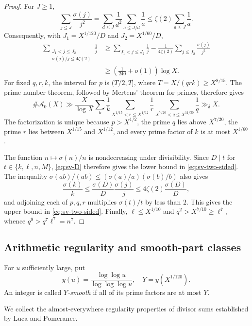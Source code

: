 \documentclass[11pt,letterpaper,reqno]{amsart}
\numberwithin{equation}{section}
\theoremstyle{remark}
\newcommand{\1}{\mathbf 1}
\renewcommand{\leq}{\leqslant}
\renewcommand{\geq}{\geqslant}
\begin{document}
\begin{proof}
For $J\geq1$,
\[
 \sum_{j\leq J}\frac{\sigma(j)}{j^2}
 =\sum_{d\leq J}\frac1{d^2}\sum_{a\leq J/d}\frac1a
 \leq\zeta(2)\sum_{a\leq J}\frac1a.
\]
Consequently, with $J_1=X^{1/120}/D$ and $J_2=X^{1/60}/D$,
\begin{align*}
 \sum_{\substack{J_1<j\leq J_2\\ \sigma(j)/j\leq4\zeta(2)}}\frac1j
 &\geq \sum_{J_1<j\leq J_2}\frac1j
 -\frac1{4\zeta(2)}\sum_{j\leq J_2}\frac{\sigma(j)}{j^2}\\
 &\geq \left(\frac1{240}+o(1)\right)\log X.
\end{align*}
For fixed $q,r,k$, the interval for $p$ is $(T/2,T]$, where
$T=X/(qrk)\geq X^{8/15}$. The prime number theorem, followed by Mertens'
theorem for primes, therefore gives
\[
 \#\mathcal{A}_0(X)
 \gg \frac{X}{\log X}
 \sum_k\frac1k
 \sum_{X^{1/15}<r\leq X^{1/12}}\frac1r
 \sum_{X^{7/20}<q\leq X^{11/30}}\frac1q
 \gg_\delta X.
\]
The factorization is unique because $p>X^{1/2}$, the prime $q$ lies above
$X^{7/20}$, the prime $r$ lies between $X^{1/15}$ and $X^{1/12}$, and
every prime factor of $k$ is at most $X^{1/60}$.

The function $n\mapsto\sigma(n)/n$ is nondecreasing under divisibility.
Since $D\mid t$ for $t\in\{k,\ell,n,M\}$, \eqref{eq:sv-D} therefore
gives the lower bound in \eqref{eq:sv-two-sided}. The inequality
$\sigma(ab)/(ab)\leq(\sigma(a)/a)(\sigma(b)/b)$ also gives
\[
 \frac{\sigma(k)}k\leq
 \frac{\sigma(D)}D\frac{\sigma(j)}j
 \leq4\zeta(2)\frac{\sigma(D)}D,
\]
and adjoining each of $p,q,r$ multiplies $\sigma(t)/t$ by less than $2$.
This gives the upper bound in \eqref{eq:sv-two-sided}. Finally,
$\ell\leq X^{1/10}$ and $q^2>X^{7/10}\geq\ell^7$, whence
$q^9>q^7\ell^7=n^7$.
\end{proof}

\subsection{Arithmetic regularity and smooth-part classes}

For $u$ sufficiently large, put
\[
 y(u)=\frac{\log\log u}{\log\log\log u},
 \quad Y=y(X^{1/120}).
\]
An integer is called \emph{$Y$-smooth} if all of its prime factors are at most
$Y$.

We collect the almost-everywhere regularity properties of divisor sums established by Luca and Pomerance.
\end{document}
